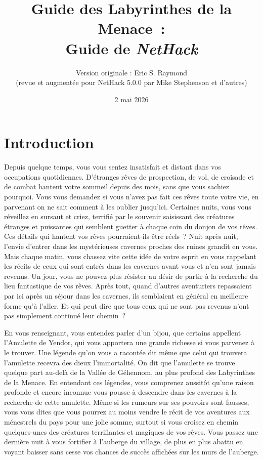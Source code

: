 \documentclass[titlepage]{article}
\begin{document}
\title{\LARGE Guide des Labyrinthes de la Menace~:\\
\Large Guide de \textit{NetHack}}
\author{Version originale : Eric S. Raymond\\
(revue et augmentée pour NetHack 5.0.0 par Mike Stephenson et d'autres)}
\date{2 mai 2026}

\maketitle


\section{Introduction}



Depuis quelque temps, vous vous sentez insatisfait et distant dans vos
occupations quotidiennes.
D'étranges rêves de prospection, de vol, de croisade et de combat hantent
votre sommeil depuis des mois, sans que vous sachiez pourquoi.
Vous vous demandez si vous n'avez pas fait ces rêves toute votre vie, en
parvenant on ne sait comment à les oublier jusqu'ici.
Certaines nuits, vous vous réveillez en sursaut et criez, terrifié par le
souvenir saisissant des créatures étranges et puissantes qui semblent
guetter à chaque coin du donjon de vos rêves.
Ces détails qui hantent vos rêves pourraient-ils être réels~?
Nuit après nuit, l'envie d'entrer dans les mystérieuses cavernes proches
des ruines grandit en vous.
Mais chaque matin, vous chassez vite cette idée de votre esprit en vous
rappelant les récits de ceux qui sont entrés dans les cavernes avant vous
et n'en sont jamais revenus.
Un jour, vous ne pouvez plus résister au désir de partir à la recherche du
lieu fantastique de vos rêves.
Après tout, quand d'autres aventuriers repassaient par ici après un séjour
dans les cavernes, ils semblaient en général en meilleure forme qu'à
l'aller.
Et qui peut dire que tous ceux qui ne sont pas revenus n'ont pas
simplement continué leur chemin~?


En vous renseignant, vous entendez parler d'un bijou, que certains
appellent l'Amulette de Yendor, qui vous apportera une grande richesse si
vous parvenez à le trouver.
Une légende qu'on vous a racontée dit même que celui qui trouvera
l'amulette recevra des dieux l'immortalité.
On dit que l'amulette se trouve quelque part au-delà de la Vallée de
Géhennom, au plus profond des Labyrinthes de la Menace.
En entendant ces légendes, vous comprenez aussitôt qu'une raison profonde
et encore inconnue vous pousse à descendre dans les cavernes à la
recherche de cette amulette.
Même si les rumeurs sur ses pouvoirs sont fausses, vous vous dites que
vous pourrez au moins vendre le récit de vos aventures aux ménestrels du
pays pour une jolie somme, surtout si vous croisez en chemin quelques-unes
des créatures terrifiantes et magiques de vos rêves.
Vous passez une dernière nuit à vous fortifier à l'auberge du village,
de plus en plus abattu en voyant baisser sans cesse vos chances de
succès affichées sur les murs de l'auberge.
\end{document}
